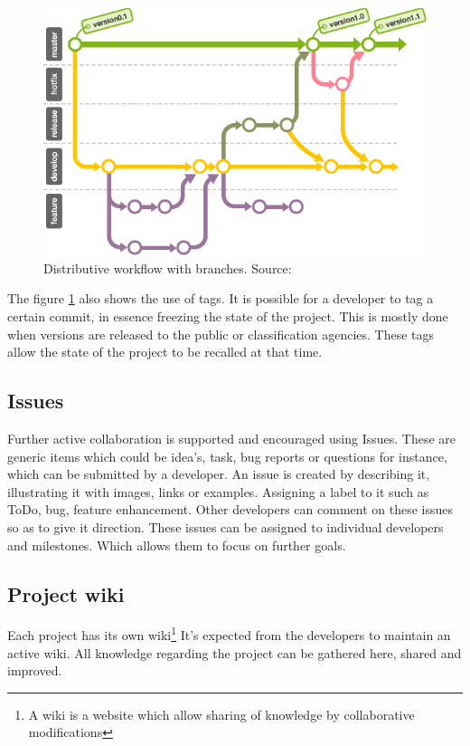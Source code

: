 \documentclass[fleqn,10pt]{SelfArx} %
\begin{document}
\begin{figure}[ht]\centering
	\includegraphics[width=\textwidth/2]{../images/stepup.png}
	\caption{Distributive workflow with branches. Source: \citeauthor{backlog_branching_2015}\cite{backlog_branching_2015} }\label{fig:branchworkflow}
\end{figure}

The figure \ref{fig:branchworkflow} also shows the use of tags. It is possible for a developer to tag a certain commit, in essence freezing the state of the project. This is mostly done when versions are released to the public or classification agencies. These tags allow the  state of the project to be recalled at that time.

\subsection{Issues}
Further active collaboration is supported and encouraged using Issues. These are generic items which could be idea's, task, bug reports or questions for instance, which can be submitted by a developer. An issue is created by describing it, illustrating it with images, links or examples. Assigning a label to it such as ToDo, bug, feature enhancement. Other developers can comment on these issues so as to give it direction. These issues can be assigned to individual developers and milestones. Which allows them to focus on further goals.

\subsection{Project wiki}
Each project has its own wiki\footnote{A wiki is a website which allow sharing of knowledge by collaborative modifications} It's expected from the developers to maintain an active wiki. All knowledge regarding the project can be gathered here, shared and improved.
\end{document}
